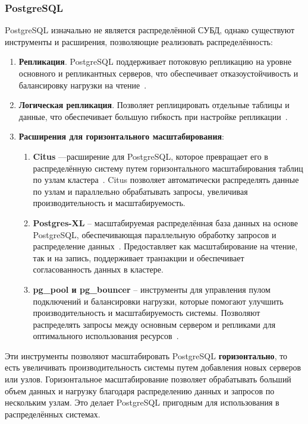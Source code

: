 \subsubsection{PostgreSQL}

PostgreSQL изначально не является распределённой СУБД, однако существуют инструменты и расширения, позволяющие реализовать распределённость:

\begin{enumerate}[wide=12.5mm, leftmargin=12.5mm]
    \item \textbf{Репликация}. PostgreSQL поддерживает потоковую репликацию на уровне основного и репликантных серверов, что обеспечивает отказоустойчивость и балансировку нагрузки на чтение~\cite{postgres-rep}.
    \item \textbf{Логическая репликация}. Позволяет реплицировать отдельные таблицы и данные, что обеспечивает большую гибкость при настройке репликации~\cite{postgres-rep}.
    \item \textbf{Расширения для горизонтального масштабирования}:
    \begin{enumerate}[wide=12.5mm, leftmargin=12.5mm]
        \item \textbf{Citus} ---расширение для PostgreSQL, которое превращает его в распределённую систему путем горизонтального масштабирования таблиц по узлам кластера~\cite{citusdata}. Citus позволяет автоматически распределять данные по узлам и параллельно обрабатывать запросы, увеличивая производительность и масштабируемость.
        \item \textbf{Postgres-XL} -- масштабируемая распределённая база данных на основе PostgreSQL, обеспечивающая параллельную обработку запросов и распределение данных~\cite{postgres-xl}. Предоставляет как масштабирование на чтение, так и на запись, поддерживает транзакции и обеспечивает согласованность данных в кластере.
        \item \textbf{pg\_pool и pg\_bouncer} -- инструменты для управления пулом подключений и балансировки нагрузки, которые помогают улучшить производительность и масштабируемость системы. Позволяют распределять запросы между основным сервером и репликами для оптимального использования ресурсов~\cite{pgpool, pgbouncer}.
    \end{enumerate}
\end{enumerate}

Эти инструменты позволяют масштабировать PostgreSQL \textbf{горизонтально}, то есть увеличивать производительность системы путем добавления новых серверов или узлов. 
Горизонтальное масштабирование позволяет обрабатывать больший объем данных и нагрузку благодаря распределению данных и запросов по нескольким узлам. 
Это делает PostgreSQL пригодным для использования в распределённых системах.

